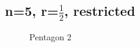 \documentclass{article}
\begin{document}
\subsection{n=5, r=$\frac{1}{2}$, restricted}
\begin{figure}[H]
\centering 
\noindent{}%
\caption{Pentagon 2}
\end{figure}
\end{document}
